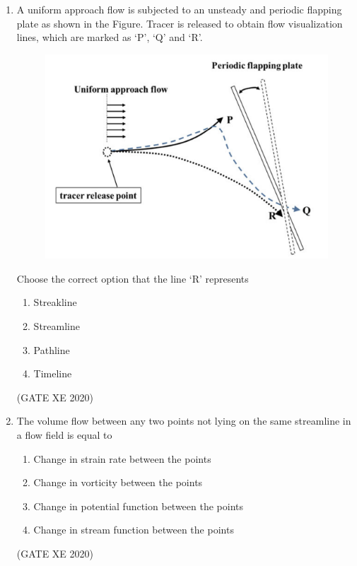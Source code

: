 \documentclass[12pt]{article}
\begin{document}
\begin{enumerate}
\begin{enumerate}
\item Motion of fluid in open channel  
\item Motion of fluid droplets  
\item Motion of fluid at high velocity  
\item Motion of fluid through a pipe  
\end{enumerate}
(GATE XE 2020)

\item A uniform approach flow is subjected to an unsteady and periodic flapping plate as shown in the Figure. Tracer is released to obtain flow visualization lines, which are marked as ‘P’, ‘Q’ and ‘R’.  

\begin{figure}[H]
    \centering
    \includegraphics[width=0.5\columnwidth]{figs/ass4_b_q6.png}
    \caption{}
    \label{fig:placeholder}
\end{figure}

Choose the correct option that the line ‘R’ represents  
\begin{enumerate}
\item Streakline
\item Streamline
\item Pathline
\item Timeline
\end{enumerate}
(GATE XE 2020)

\item The volume flow between any two points not lying on the same streamline in a flow field is equal to  
\begin{enumerate}
\item Change in strain rate between the points
\item Change in vorticity between the points
\item Change in potential function between the points
\item Change in stream function between the points
\end{enumerate}
(GATE XE 2020)


\end{enumerate}
\end{document}
